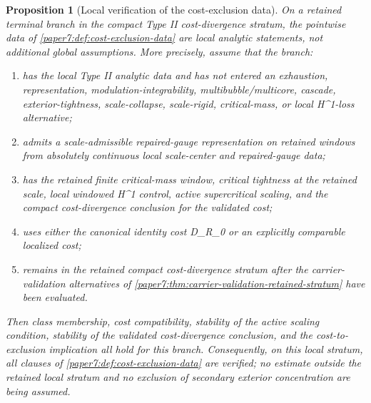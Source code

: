 \documentclass[11pt]{amsart}
\def\({}%
\def\){}%
\def\tilde#1{#1}%
\def\mathfrak#1{#1}%
\theoremstyle{plain}
\newtheorem{proposition}[proposition]{Proposition}
\theoremstyle{definition}
\theoremstyle{remark}
\begin{document}
\begin{proposition}[Local verification of the cost-exclusion data]
\label{paper7:prop:local-cost-exclusion-data-verification}
On a retained terminal branch in the compact Type II cost-divergence stratum,
the pointwise data of \cref{paper7:def:cost-exclusion-data} are local
analytic statements, not additional global assumptions.  More precisely, assume
that the branch:
\begin{enumerate}[label=\textup{(\roman*)}]
\item has the local Type II analytic data and has not entered an exhaustion,
representation, modulation-integrability, multibubble/multicore, cascade,
exterior-tightness, scale-collapse, scale-rigid, critical-mass, or local
\(H^1\)-loss alternative;
\item admits a scale-admissible repaired-gauge representation on retained
windows from absolutely continuous local scale-center and repaired-gauge data;
\item has the retained finite critical-mass window, critical tightness at the
retained scale, local windowed \(H^1\) control, active supercritical scaling,
and the compact cost-divergence conclusion for the validated cost;
\item uses either the canonical identity cost
\(\tilde{\mathfrak D}_{R_0}\) or an explicitly comparable localized cost;
\item remains in the retained compact cost-divergence stratum after the
carrier-validation alternatives of
\cref{paper7:thm:carrier-validation-retained-stratum} have been evaluated.
\end{enumerate}
Then class membership, cost compatibility, stability of the active scaling
condition, stability of the validated cost-divergence conclusion, and the
cost-to-exclusion implication all hold for this branch.  Consequently, on this
local stratum, all clauses of \cref{paper7:def:cost-exclusion-data} are verified;
no estimate outside the retained local stratum and no exclusion of secondary
exterior concentration are being assumed.
\end{proposition}
\end{document}

